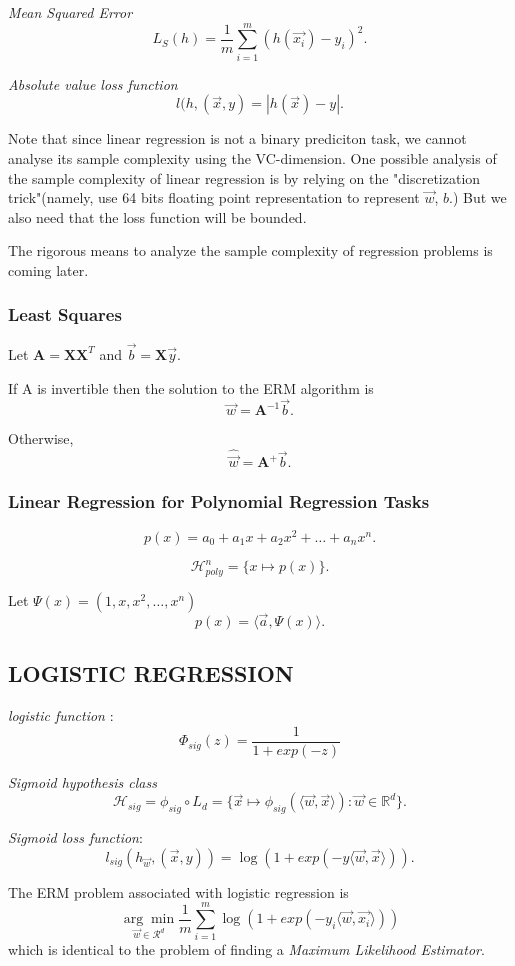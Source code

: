 \emph{Mean Squared Error}
\[
	L_S(h) = \frac{1}{m}\sum\limits^m_{i=1}(h(\vec{x_i}) - y_i)^2
.\]

\emph{Absolute value loss function}
\[
	l(h,(\vec{x},y) = |h(\vec{x})-y|
.\]

Note that since linear regression is not a binary prediciton task,
we cannot analyse its sample complexity using the VC-dimension.
One possible analysis of the sample complexity of linear regression is by relying on the
"discretization trick"(namely, use 64 bits floating point representation to represent $\vec{w}$, $b$.)
But we also need that the loss function will be bounded.

The rigorous means to analyze the sample complexity of regression problems is coming later.

\subsubsection{Least Squares}

Let $\mathbf A = \mathbf X \mathbf X^T$ and $\vec{b} = \mathbf X \vec{y}$.

If A is invertible then the solution to the ERM algorithm is 
\[
	\vec{w} = \mathbf A^{-1}\vec{b}
.\]

Otherwise,
\[
	\hat{\vec{w}} = \mathbf A^{+}\vec{b} 
.\]

\subsubsection{Linear Regression for Polynomial Regression Tasks}

\[
	p(x) = a_0 + a_1x + a_2x^2+ \dots + a_nx^n
.\]

 \[
	 \mathcal{H}^n_{poly} = \{x \mapsto p(x) \}
.\]

Let $\Psi(x) = (1, x, x^2, \dots, x^n)$
 \[
	 p(x) = \langle \vec{a}, \Psi(x) \rangle
.\]

\subsection{LOGISTIC REGRESSION}

\emph{logistic function} :
\begin{equation}
	\Phi_{sig}(z) = \frac{1}{1+exp(-z)}	
\end{equation}

\emph{Sigmoid hypothesis class}
 \[
	 \mathcal{H}_{sig} = \phi_{sig} \circ L_d = 
	 \{\vec{x}\mapsto \phi_{sig}(\langle \vec{w},\vec{x} \rangle):\vec{w}\in\mathbb{R}^d \}
.\]

\emph{Sigmoid loss function}:
\[
	l_{sig}(h_{\vec{w}},(\vec{x},y)) = \log(1+exp(-y\langle \vec{w}, \vec{x} \rangle))
.\]

The ERM problem associated with logistic regression is
\begin{equation}
	\underset{\vec{w}\in\mathcal{R}^d}{\arg\min}
	\frac{1}{m} \sum\limits^m_{i=1}\log(1+exp(-y_i \langle \vec{w},\vec{x_i} \rangle ))
\end{equation}
which is identical to the problem of finding a \emph{Maximum Likelihood Estimator}.




